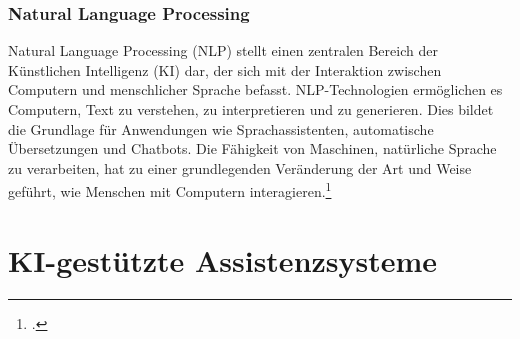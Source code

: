 \subsubsection{Natural Language Processing}

Natural Language Processing (NLP) stellt einen zentralen Bereich der Künstlichen Intelligenz (KI) dar, der sich mit der Interaktion zwischen Computern und menschlicher Sprache befasst. NLP-Technologien ermöglichen es Computern, Text zu verstehen, zu interpretieren und zu generieren. Dies bildet die Grundlage für Anwendungen wie Sprachassistenten, automatische Übersetzungen und Chatbots. Die Fähigkeit von Maschinen, natürliche Sprache zu verarbeiten, hat zu einer grundlegenden Veränderung der Art und Weise geführt, wie Menschen mit Computern interagieren.\footcite[22]{oecd_oecd-bericht_2024}

\section{KI-gestützte Assistenzsysteme}